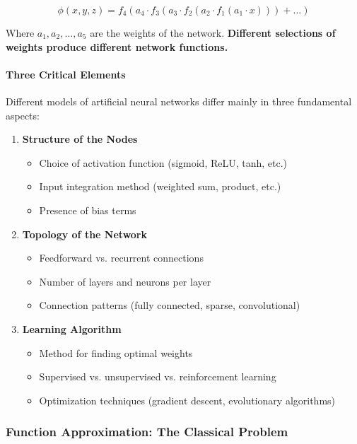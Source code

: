 \begin{equation}
\label{eq:network-function}
\phi(x, y, z) = f_4\left(a_4 \cdot f_3\left(a_3 \cdot f_2\left(a_2 \cdot f_1(a_1 \cdot x)\right)\right) + \ldots\right)
\end{equation}

Where $a_1, a_2, \ldots, a_5$ are the weights of the network. \textbf{Different selections of weights produce different network functions.}

\paragraph{Three Critical Elements}
\label{para:three-critical-elements}

Different models of artificial neural networks differ mainly in three fundamental aspects:

\begin{enumerate}
\item \textbf{Structure of the Nodes}
\begin{itemize}
\item Choice of activation function (sigmoid, ReLU, tanh, etc.)
\item Input integration method (weighted sum, product, etc.)
\item Presence of bias terms
\end{itemize}

\item \textbf{Topology of the Network}
\begin{itemize}
\item Feedforward vs. recurrent connections
\item Number of layers and neurons per layer
\item Connection patterns (fully connected, sparse, convolutional)
\end{itemize}

\item \textbf{Learning Algorithm}
\begin{itemize}
\item Method for finding optimal weights
\item Supervised vs. unsupervised vs. reinforcement learning
\item Optimization techniques (gradient descent, evolutionary algorithms)
\end{itemize}
\end{enumerate}

\subsubsection{Function Approximation: The Classical Problem}
\label{subsubsec:function-approximation-classical}

